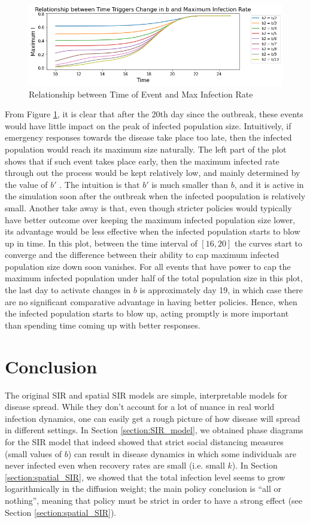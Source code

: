 \documentclass[12pt, reqno]{amsart}
\begin{document}
\begin{figure}[h]
        \centering
        \includegraphics[scale=0.4]{./b_and_max_i.png}
        \caption{Relationship between Time of Event and Max Infection Rate}
        \label{fig:T3}
\end{figure}
From Figure \ref{fig:T3}, it is clear that after the 20th day since the outbreak, these events would have little impact on the peak of infected population size. Intuitively, if emergency responses towards the disease take place too late, then the infected population would reach its maximum size naturally. The left part of the plot shows that if such event takes place early, then the maximum infected rate through out the process would be kept relatively low, and mainly determined by the value of $b'$ . The intuition is that $b'$ is much smaller than $b$, and it is active in the simulation soon after the outbreak when the infected poopulation is relatively small. Another take away is that, even though stricter policies would typically have better outcome over keeping the maximum infected population size lower, its advantage would be less effective when the infected population starts to blow up in time. In this plot, between the time interval of $[16, 20]$ the curves start to converge and the difference between their ability to cap maximum infected population size down soon vanishes. For all events that have power to cap the maximum infected population under half of the total population size in this plot, the last day to activate changes in $b$ is approximately day 19, in which case there are no significant comparative advantage in having better policies. Hence, when the infected population starts to blow up, acting promptly is more important than spending time coming up with better responses. 


    \section{Conclusion}
    The original SIR and spatial SIR models are simple, interpretable models for disease spread. While they don't account for a lot of nuance in real world infection dynamics, one can easily get a rough picture of how disease will spread in different settings. In Section \ref{section:SIR_model}, we obtained phase diagrams for the SIR model that indeed showed that strict social distancing measures (small values of \(b\)) can result in disease dynamics in which some individuals are never infected even when recovery rates are small (i.e. small \(k\)). In Section \ref{section:spatial_SIR}, we showed that the total infection level seems to grow logarithmically in the diffusion weight; the main policy conclusion is ``all or nothing'', meaning that policy must be strict in order to have a strong effect (see Section \ref{section:spatial_SIR}).
\end{document}
